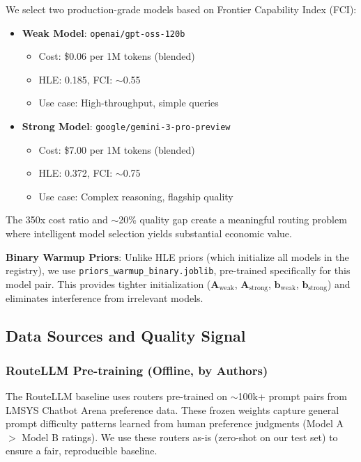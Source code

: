 We select two production-grade models based on Frontier Capability Index (FCI):

\begin{itemize}
    \item \textbf{Weak Model}: \texttt{openai/gpt-oss-120b} 
        \begin{itemize}
            \item Cost: \$0.06 per 1M tokens (blended)
            \item HLE: 0.185, FCI: $\sim$0.55
            \item Use case: High-throughput, simple queries
        \end{itemize}
    \item \textbf{Strong Model}: \texttt{google/gemini-3-pro-preview}
        \begin{itemize}
            \item Cost: \$7.00 per 1M tokens (blended)
            \item HLE: 0.372, FCI: $\sim$0.75
            \item Use case: Complex reasoning, flagship quality
        \end{itemize}
\end{itemize}

\noindent The 350x cost ratio and $\sim$20\% quality gap create a meaningful routing problem where intelligent model selection yields substantial economic value.

\noindent \textbf{Binary Warmup Priors}: Unlike HLE priors (which initialize all models in the registry), we use \texttt{priors\_warmup\_binary.joblib}, pre-trained specifically for this model pair. This provides tighter initialization ($\mathbf{A}_{\text{weak}}$, $\mathbf{A}_{\text{strong}}$, $\mathbf{b}_{\text{weak}}$, $\mathbf{b}_{\text{strong}}$) and eliminates interference from irrelevant models.

\subsection{Data Sources and Quality Signal}

\subsubsection{RouteLLM Pre-training (Offline, by Authors)}

The RouteLLM baseline uses routers pre-trained on $\sim$100k+ prompt pairs from LMSYS Chatbot Arena preference data. These frozen weights capture general prompt difficulty patterns learned from human preference judgments (Model A $>$ Model B ratings). We use these routers as-is (zero-shot on our test set) to ensure a fair, reproducible baseline.

